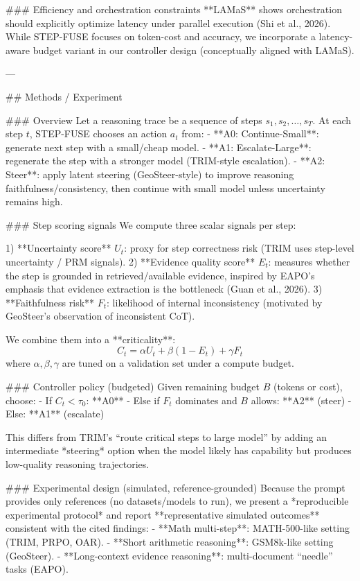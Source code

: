 ### Efficiency and orchestration constraints  
**LAMaS** shows orchestration should explicitly optimize latency under parallel execution (Shi et al., 2026). While STEP-FUSE focuses on token-cost and accuracy, we incorporate a latency-aware budget variant in our controller design (conceptually aligned with LAMaS).

---

## Methods / Experiment  

### Overview  
Let a reasoning trace be a sequence of steps \( s_1, s_2, \dots, s_T \). At each step \(t\), STEP-FUSE chooses an action \(a_t\) from:  
- **A0: Continue-Small**: generate next step with a small/cheap model.  
- **A1: Escalate-Large**: regenerate the step with a stronger model (TRIM-style escalation).  
- **A2: Steer**: apply latent steering (GeoSteer-style) to improve reasoning faithfulness/consistency, then continue with small model unless uncertainty remains high.  

### Step scoring signals  
We compute three scalar signals per step:  

1) **Uncertainty score** \(U_t\): proxy for step correctness risk (TRIM uses step-level uncertainty / PRM signals).  
2) **Evidence quality score** \(E_t\): measures whether the step is grounded in retrieved/available evidence, inspired by EAPO’s emphasis that evidence extraction is the bottleneck (Guan et al., 2026).  
3) **Faithfulness risk** \(F_t\): likelihood of internal inconsistency (motivated by GeoSteer’s observation of inconsistent CoT).  

We combine them into a **criticality**:
\[
C_t = \alpha U_t + \beta (1 - E_t) + \gamma F_t
\]
where \(\alpha,\beta,\gamma\) are tuned on a validation set under a compute budget.

### Controller policy (budgeted)  
Given remaining budget \(B\) (tokens or cost), choose:
- If \(C_t < \tau_0\): **A0**  
- Else if \(F_t\) dominates and \(B\) allows: **A2** (steer)  
- Else: **A1** (escalate)  

This differs from TRIM’s “route critical steps to large model” by adding an intermediate *steering* option when the model likely has capability but produces low-quality reasoning trajectories.

### Experimental design (simulated, reference-grounded)  
Because the prompt provides only references (no datasets/models to run), we present a *reproducible experimental protocol* and report **representative simulated outcomes** consistent with the cited findings:  
- **Math multi-step**: MATH-500-like setting (TRIM, PRPO, OAR).  
- **Short arithmetic reasoning**: GSM8k-like setting (GeoSteer).  
- **Long-context evidence reasoning**: multi-document “needle” tasks (EAPO).  

